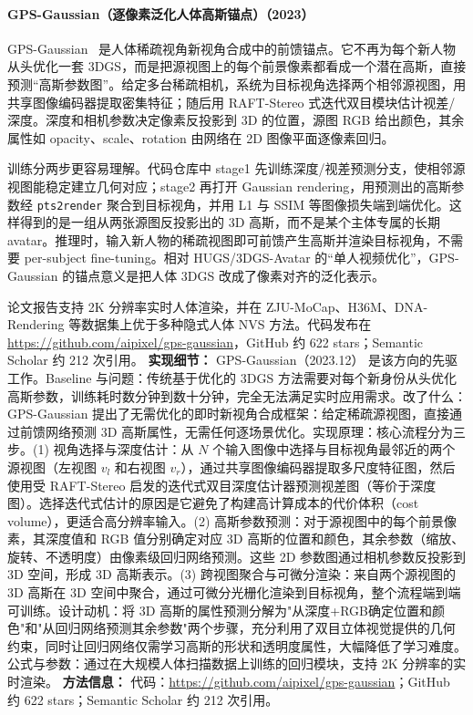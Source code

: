 \paragraph{GPS-Gaussian（逐像素泛化人体高斯锚点）（2023）}
GPS-Gaussian~\cite{2312_02155} 是人体稀疏视角新视角合成中的前馈锚点。它不再为每个新人物从头优化一套 3DGS，而是把源视图上的每个前景像素都看成一个潜在高斯，直接预测“高斯参数图”。给定多台稀疏相机，系统为目标视角选择两个相邻源视图，用共享图像编码器提取密集特征；随后用 RAFT-Stereo 式迭代双目模块估计视差/深度。深度和相机参数决定像素反投影到 3D 的位置，源图 RGB 给出颜色，其余属性如 opacity、scale、rotation 由网络在 2D 图像平面逐像素回归。

训练分两步更容易理解。代码仓库中 stage1 先训练深度/视差预测分支，使相邻源视图能稳定建立几何对应；stage2 再打开 Gaussian rendering，用预测出的高斯参数经 \texttt{pts2render} 聚合到目标视角，并用 L1 与 SSIM 等图像损失端到端优化。这样得到的是一组从两张源图反投影出的 3D 高斯，而不是某个主体专属的长期 avatar。推理时，输入新人物的稀疏视图即可前馈产生高斯并渲染目标视角，不需要 per-subject fine-tuning。相对 HUGS/3DGS-Avatar 的“单人视频优化”，GPS-Gaussian 的锚点意义是把人体 3DGS 改成了像素对齐的泛化表示。

论文报告支持 2K 分辨率实时人体渲染，并在 ZJU-MoCap、H36M、DNA-Rendering 等数据集上优于多种隐式人体 NVS 方法。代码发布在 \url{https://github.com/aipixel/gps-gaussian}，GitHub 约 622 stars；Semantic Scholar 约 212 次引用。
\textbf{实现细节：} GPS-Gaussian（2023.12） 是该方向的先驱工作。Baseline 与问题：传统基于优化的 3DGS 方法需要对每个新身份从头优化高斯参数，训练耗时数分钟到数十分钟，完全无法满足实时应用需求。改了什么：GPS-Gaussian 提出了无需优化的即时新视角合成框架：给定稀疏源视图，直接通过前馈网络预测 3D 高斯属性，无需任何逐场景优化。实现原理：核心流程分为三步。(1) 视角选择与深度估计：从 $N$ 个输入图像中选择与目标视角最邻近的两个源视图（左视图 $v_l$ 和右视图 $v_r$），通过共享图像编码器提取多尺度特征图，然后使用受 RAFT-Stereo 启发的迭代式双目深度估计器预测视差图（等价于深度图）。选择迭代式估计的原因是它避免了构建高计算成本的代价体积（cost volume），更适合高分辨率输入。(2) 高斯参数预测：对于源视图中的每个前景像素，其深度值和 RGB 值分别确定对应 3D 高斯的位置和颜色，其余参数（缩放、旋转、不透明度）由像素级回归网络预测。这些 2D 参数图通过相机参数反投影到 3D 空间，形成 3D 高斯表示。(3) 跨视图聚合与可微分渲染：来自两个源视图的 3D 高斯在 3D 空间中聚合，通过可微分光栅化渲染到目标视角，整个流程端到端可训练。设计动机：将 3D 高斯的属性预测分解为"从深度+RGB确定位置和颜色"和"从回归网络预测其余参数"两个步骤，充分利用了双目立体视觉提供的几何约束，同时让回归网络仅需学习高斯的形状和透明度属性，大幅降低了学习难度。公式与参数：通过在大规模人体扫描数据上训练的回归模块，支持 2K 分辨率的实时渲染。
\textbf{方法信息：} 代码：\url{https://github.com/aipixel/gps-gaussian}；GitHub 约 622 stars；Semantic Scholar 约 212 次引用。



